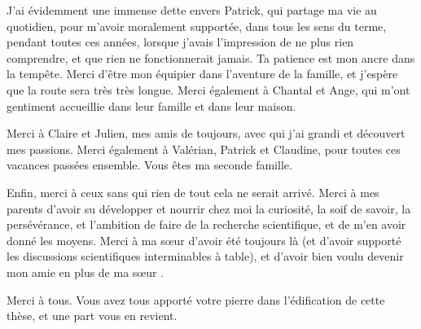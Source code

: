 J'ai évidemment une immense dette envers Patrick, qui partage ma vie au quotidien, pour m'avoir moralement supportée, dans tous les sens du terme, pendant toutes ces années, lorsque j'avais l'impression de ne plus rien comprendre, et que rien ne fonctionnerait jamais. Ta patience est mon ancre dans la tempête. Merci d'être mon équipier dans l'aventure de la famille, et j'espère que la route sera très très longue. Merci également à Chantal et Ange, qui m'ont gentiment accueillie dans leur famille et dans leur maison. 

Merci à Claire et Julien, mes amis de toujours, avec qui j'ai grandi et découvert mes passions. Merci également à Valérian, Patrick et Claudine, pour toutes ces vacances passées ensemble. Vous êtes ma seconde famille. 


Enfin, merci à ceux sans qui rien de tout cela ne serait arrivé. Merci à mes parents d'avoir su développer et nourrir chez moi la curiosité, la soif de savoir, la persévérance, et l'ambition de faire de la recherche scientifique, et de m'en avoir donné les moyens. Merci à ma  s\oe ur d'avoir été toujours là (et d'avoir supporté les discussions scientifiques interminables à table), et d'avoir bien voulu devenir mon amie en plus de ma s\oe ur . 

Merci à tous. Vous avez tous apporté votre pierre dans l'édification de cette thèse, et une part vous en revient. 

